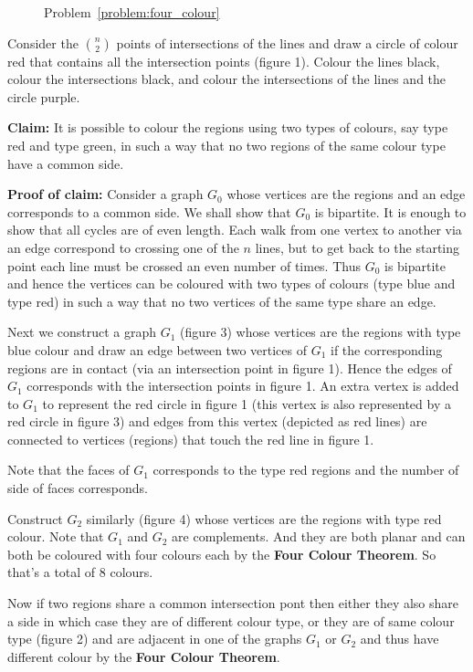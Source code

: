 \documentclass{article}
\begin{document}
\begin{enumerate}
{\begin{figure}[!ht]
\caption{Problem~\ref{problem:four_colour}}
\end{figure}

Consider the $\binom{n}{2}$ points of intersections of the lines and draw a circle of colour red that contains all the intersection points (figure 1). Colour the lines black, colour the intersections black, and colour the intersections of the lines and the circle purple.

\textbf{Claim:} It is possible to colour the regions using two types of colours, say type red and type green, in such a way that no two regions of the same colour type have a common side.

\textbf{Proof of claim:} Consider a graph $G_0$ whose vertices are the regions and an edge corresponds to a common side. We shall show that $G_0$ is bipartite. It is enough to show that all cycles are of even length. Each walk from one vertex to another via an edge correspond to crossing one of the $n$ lines, but to get back to the starting point each line must be crossed an even number of times. Thus $G_0$ is bipartite and hence the vertices can be coloured with two types of colours (type blue and type red) in such a way that no two vertices of the same type share an edge.

Next we construct a graph $G_1$ (figure 3) whose vertices are the regions with type blue colour and draw an edge between two vertices of $G_1$ if the corresponding regions are in contact (via an intersection point in figure 1). Hence the edges of $G_1$ corresponds with the intersection points in figure 1. An extra vertex is added to $G_1$ to represent the red circle in figure 1 (this vertex is also represented by a red circle in figure 3) and edges from this vertex (depicted as red lines) are connected to vertices (regions) that touch the red line in figure 1.

Note that the faces of $G_1$ corresponds to the type red regions and the number of side of faces corresponds.

Construct $G_2$ similarly (figure 4) whose vertices are the regions with type red colour. Note that $G_1$ and $G_2$ are complements. And they are both planar and can both be coloured with four colours each by the \textbf{Four Colour Theorem}. So that's a total of $8$ colours.

Now if two regions share a common intersection pont then either they also share a side in which case they are of different colour type, or they are of same colour type (figure 2) and are adjacent in one of the graphs $G_1$ or $G_2$ and thus have different colour by the \textbf{Four Colour Theorem}.
}


\end{enumerate}
\end{document}
